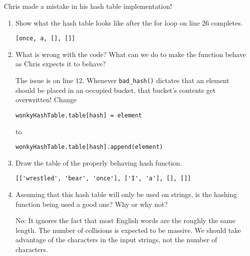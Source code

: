 %
%


Chris made a mistake in his hash table implementation!

    

    \begin{enumerate}
    \item Show what the hash table looks like after the for loop on line 26
          completes.

        \begin{answer}
		\begin{lstlisting}[numbers=none]
[once, a, [], []]
		\end{lstlisting}
        \end{answer}

    \item What is wrong with the code? What can we do to make the function behave as Chris expects it to behave?

        \begin{answer}
        The issue is on line 12. Whenever \texttt{bad\_hash()} dictates that an element should be placed in an occupied bucket, that bucket's contents get overwritten! Change 
\begin{lstlisting}[numbers=none]
wonkyHashTable.table[hash] = element
\end{lstlisting} to
\begin{lstlisting}[numbers=none]
wonkyHashTable.table[hash].append(element)
\end{lstlisting}
        \end{answer}

    \item Draw the table of the properly behaving hash function.

        \begin{answer}
		\begin{lstlisting}[numbers=none]
[['wrestled', 'bear', 'once'], ['I', 'a'], [], []]
		\end{lstlisting}
    \end{answer}
\item Assuming that this hash table will only be used on strings, is the hashing function being used a good one? Why or why not?

    \begin{answer}
        No: It ignores the fact that most English words are the roughly the same length. The number of collisions is expected to be massive. We should take advantage of the characters in the input strings, not the number of characters.
    \end{answer}
    \end{enumerate}
